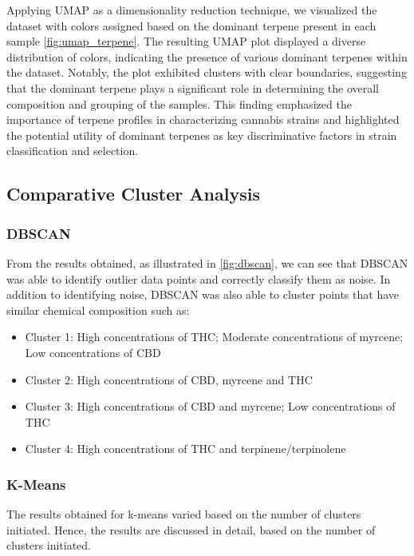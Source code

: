 \documentclass[11pt,a4paper]{article}
\newcommand{\noi}{\noindent}
\begin{document}
\noi
Applying UMAP as a dimensionality reduction technique, we visualized the dataset with colors assigned based on the dominant terpene present in each sample \autoref{fig:umap_terpene}. The resulting UMAP plot displayed a diverse distribution of colors, indicating the presence of various dominant terpenes within the dataset. Notably, the plot exhibited clusters with clear boundaries, suggesting that the dominant terpene plays a significant role in determining the overall composition and grouping of the samples. This finding emphasized the importance of terpene profiles in characterizing cannabis strains and highlighted the potential utility of dominant terpenes as key discriminative factors in strain classification and selection. 

\subsection{Comparative Cluster Analysis}
\subsubsection{DBSCAN}
From the results obtained, as illustrated in \autoref{fig:dbscan}, we can see that DBSCAN was able to identify outlier data points and correctly classify them as noise. In addition to identifying noise, DBSCAN was also able to cluster points that have similar chemical composition such as:
\begin{itemize}
	\itemsep0em
	\item Cluster 1: High concentrations of THC; Moderate concentrations of myrcene; Low concentrations of CBD
	\item Cluster 2: High concentrations of CBD, myrcene and THC
	\item Cluster 3: High concentrations of CBD and myrcene; Low concentrations of THC
	\item Cluster 4: High concentrations of THC and terpinene/terpinolene
\end{itemize}

\subsubsection{K-Means}
The results obtained for k-means varied based on the number of clusters initiated. Hence, the results are discussed in detail, based on the number of clusters initiated.
\end{document}
